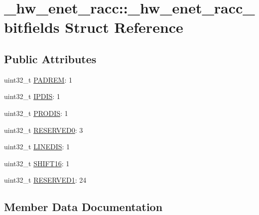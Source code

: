 \hypertarget{struct__hw__enet__racc_1_1__hw__enet__racc__bitfields}{}\section{\+\_\+hw\+\_\+enet\+\_\+racc\+:\+:\+\_\+hw\+\_\+enet\+\_\+racc\+\_\+bitfields Struct Reference}
\label{struct__hw__enet__racc_1_1__hw__enet__racc__bitfields}
\subsection*{Public Attributes}
\begin{DoxyCompactItemize}
\item 
uint32\+\_\+t \hyperlink{struct__hw__enet__racc_1_1__hw__enet__racc__bitfields_a5488d2a234f59a4c81dc91e627e033f2}{P\+A\+D\+R\+EM}\+: 1
\item 
uint32\+\_\+t \hyperlink{struct__hw__enet__racc_1_1__hw__enet__racc__bitfields_a7f08e0e9de2c068d044a901d396303d4}{I\+P\+D\+IS}\+: 1
\item 
uint32\+\_\+t \hyperlink{struct__hw__enet__racc_1_1__hw__enet__racc__bitfields_a0a340102ef13d4deb3308cc862284d66}{P\+R\+O\+D\+IS}\+: 1
\item 
uint32\+\_\+t \hyperlink{struct__hw__enet__racc_1_1__hw__enet__racc__bitfields_a8d0ead8ccf858d1e1bed8a86b561f8d5}{R\+E\+S\+E\+R\+V\+E\+D0}\+: 3
\item 
uint32\+\_\+t \hyperlink{struct__hw__enet__racc_1_1__hw__enet__racc__bitfields_a4b32b136f6c1b0a8917685db71e9c445}{L\+I\+N\+E\+D\+IS}\+: 1
\item 
uint32\+\_\+t \hyperlink{struct__hw__enet__racc_1_1__hw__enet__racc__bitfields_af64b439b5aa8010e18d6db3c5e0676bd}{S\+H\+I\+F\+T16}\+: 1
\item 
uint32\+\_\+t \hyperlink{struct__hw__enet__racc_1_1__hw__enet__racc__bitfields_a262db9e9b9b2d38ac17ebeea43fbdf1a}{R\+E\+S\+E\+R\+V\+E\+D1}\+: 24
\end{DoxyCompactItemize}


\subsection{Member Data Documentation}
